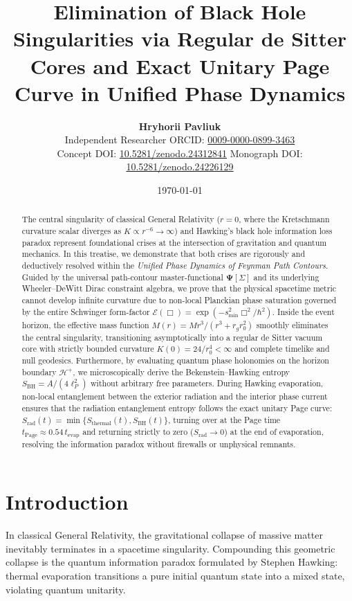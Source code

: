 \documentclass[11pt,a4paper]{article}
\title{\textbf{Elimination of Black Hole Singularities via Regular de Sitter Cores and Exact Unitary Page Curve in Unified Phase Dynamics}}
\author{\textbf{Hryhorii Pavliuk}\\[0.4em]
\small Independent Researcher \quad\textbar\quad \small ORCID: \href{https://orcid.org/0009-0000-0899-3463}{0009-0000-0899-3463}\\
\small Concept DOI: \href{https://doi.org/10.5281/zenodo.24312841}{10.5281/zenodo.24312841} \quad\textbar\quad \small Monograph DOI: \href{https://doi.org/10.5281/zenodo.24226129}{10.5281/zenodo.24226129}}
\date{\today}
\begin{document}
\maketitle

\begin{abstract}
The central singularity of classical General Relativity ($r = 0$, where the Kretschmann curvature scalar diverges as $K \propto r^{-6} \to \infty$) and Hawking's black hole information loss paradox represent foundational crises at the intersection of gravitation and quantum mechanics. In this treatise, we demonstrate that both crises are rigorously and deductively resolved within the \textit{Unified Phase Dynamics of Feynman Path Contours}. Guided by the universal path-contour master-functional $\mathbf{\Psi}[\Sigma]$ and its underlying Wheeler--DeWitt Dirac constraint algebra, we prove that the physical spacetime metric cannot develop infinite curvature due to non-local Planckian phase saturation governed by the entire Schwinger form-factor $\mathcal{E}(\Box) = \exp(-s_{\mathrm{min}}^2 \Box^2 / \hbar^2)$. Inside the event horizon, the effective mass function $M(r) = M r^3 / (r^3 + r_g r_0^2)$ smoothly eliminates the central singularity, transitioning asymptotically into a regular de Sitter vacuum core with strictly bounded curvature $K(0) = 24 / r_0^4 < \infty$ and complete timelike and null geodesics. Furthermore, by evaluating quantum phase holonomies on the horizon boundary $\mathcal{H}^+$, we microscopically derive the Bekenstein--Hawking entropy $S_{\mathrm{BH}} = A / (4 \ell_P^2)$ without arbitrary free parameters. During Hawking evaporation, non-local entanglement between the exterior radiation and the interior phase current ensures that the radiation entanglement entropy follows the exact unitary Page curve: $S_{\mathrm{rad}}(t) = \min \{ S_{\mathrm{thermal}}(t), S_{\mathrm{BH}}(t) \}$, turning over at the Page time $t_{\mathrm{Page}} \approx 0.54\,t_{\mathrm{evap}}$ and returning strictly to zero ($S_{\mathrm{rad}} \to 0$) at the end of evaporation, resolving the information paradox without firewalls or unphysical remnants.
\end{abstract}

\section{Introduction}
In classical General Relativity, the gravitational collapse of massive matter inevitably terminates in a spacetime singularity. Compounding this geometric collapse is the quantum information paradox formulated by Stephen Hawking: thermal evaporation transitions a pure initial quantum state into a mixed state, violating quantum unitarity.
\end{document}
